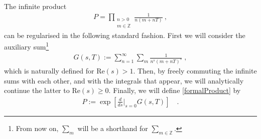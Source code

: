 \documentclass[11pt]{article}
\numberwithin{equation}{section}
\begin{document}
\begin{appendix}
The infinite product
\begin{align}
P=\prod_{\substack{n > 0 \\ m\in{\mathbb Z}}}\frac{1 }{n(m + n T)}\ ,
\label{formalProduct}
\end{align}
can be regularised in the following standard fashion. First we will consider the auxiliary sum\footnote{From now on, $\sum_{m}$ will be a shorthand for $\sum_{m\in\mathbb{Z}}$.}
\begin{align}
G(s,T) := \sum_{n=1}^\infty\sum_{m} \frac{1}{n^s (m+ n T)^s}\;,
\label{auxiliarySum}
\end{align}
which is naturally defined for $\text{Re}(s)>1$. Then, by freely commuting the infinite sums with each other, and with the integrals that  appear,  we will analytically continue the latter to $\text{Re}(s)\ge0$. Finally, we will define \eqref{formalProduct} by
\begin{align}
P:=\exp\left[\frac{d}{ds}\Bigg|_{s=0}G(s,T) \right]\quad.
\label{ProductRegularized}
\end{align}
 

\end{appendix}
\end{document}
